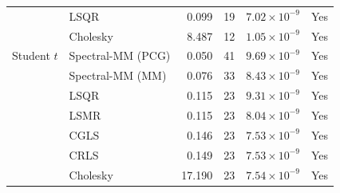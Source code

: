\begin{table}[htbp]
\begin{tabular}{llrrrc}
 & LSQR & 0.099 & 19 & $7.02\times10^{-9}$ & Yes \\
 & Cholesky & 8.487 & 12 & $1.05\times10^{-9}$ & Yes \\
\midrule
Student $t$ & Spectral-MM (PCG) & 0.050 & 41 & $9.69\times10^{-9}$ & Yes \\
 & Spectral-MM (MM) & 0.076 & 33 & $8.43\times10^{-9}$ & Yes \\
 & LSQR & 0.115 & 23 & $9.31\times10^{-9}$ & Yes \\
 & LSMR & 0.115 & 23 & $8.04\times10^{-9}$ & Yes \\
 & CGLS & 0.146 & 23 & $7.53\times10^{-9}$ & Yes \\
 & CRLS & 0.149 & 23 & $7.53\times10^{-9}$ & Yes \\
 & Cholesky & 17.190 & 23 & $7.54\times10^{-9}$ & Yes \\
\bottomrule
\end{tabular}
\end{table}
